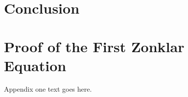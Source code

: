 \documentclass[journal]{IEEEtran}
\begin{document}





\section{Conclusion}






%


\appendices
\section{Proof of the First Zonklar Equation}
Appendix one text goes here.
\end{document}
